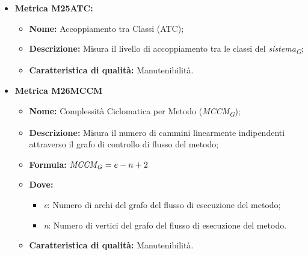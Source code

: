 \begin{itemize}
    \vspace{0.4cm}
    \item \hypertarget{item:M25ATC}{\textbf{Metrica M25ATC:}}
    \vspace{0.2cm}
        
    \begin{minipage}[H]{0.9\textwidth}
        \begin{itemize}
            \item \textbf{Nome:} Accoppiamento tra Classi (ATC);
            \item \textbf{Descrizione:} Misura il livello di accoppiamento tra le classi del \textit{sistema}\textsubscript{\textit{G}};
            \item \textbf{Caratteristica di qualità:} Manutenibilità.
        \end{itemize}
    \end{minipage}

    \vspace{0.4cm}
    \item \hypertarget{item:M26MCCM}{\textbf{Metrica M26MCCM}}
    \vspace{0.2cm}
    
    \begin{minipage}[H]{0.9\textwidth}
        \begin{itemize}
            \item \textbf{Nome:} Complessità Ciclomatica per Metodo (\textit{MCCM}\textsubscript{\textit{G}});
            \item \textbf{Descrizione:} Misura il numero di cammini linearmente indipendenti attraverso il grafo di controllo di flusso del metodo;
            \item \textbf{Formula:} $\textit{MCCM}\textsubscript{\textit{G}} = e - n + 2$
            \item \textbf{Dove:}
                \begin{itemize}
                    \item \textit{e}: Numero di archi del grafo del flusso di esecuzione del metodo;
                    \item \textit{n}: Numero di vertici del grafo del flusso di esecuzione del metodo.
                \end{itemize}
            \item \textbf{Caratteristica di qualità:} Manutenibilità.
        \end{itemize}
    \end{minipage}


\end{itemize}

